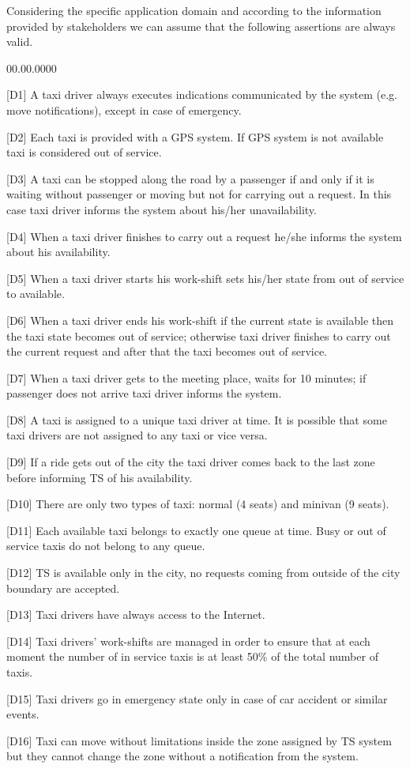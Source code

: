 Considering the specific application domain and according to the information
provided by stakeholders we can assume that the following assertions
are always valid.
\begin{lyxlist}{00.00.0000}
\item [{{[}D1{]}}] A taxi driver always executes indications communicated
by the system (e.g. move notifications), except in case of emergency.
\item [{{[}D2{]}}] Each taxi is provided with a GPS system. If GPS system
is not available taxi is considered out of service.
\item [{{[}D3{]}}] A taxi can be stopped along the road by a passenger
if and only if it is waiting without passenger or moving but not for
carrying out a request. In this case taxi driver informs the system
about his/her unavailability.
\item [{{[}D4{]}}] When a taxi driver finishes to carry out a request he/she
informs the system about his availability.
\item [{{[}D5{]}}] When a taxi driver starts his work-shift sets his/her
state from out of service to available.
\item [{{[}D6{]}}] When a taxi driver ends his work-shift if the current
state is available then the taxi state becomes out of service; otherwise
taxi driver finishes to carry out the current request and after that
the taxi becomes out of service.
\item [{{[}D7{]}}] When a taxi driver gets to the meeting place, waits
for 10 minutes; if passenger does not arrive taxi driver informs the
system.
\item [{{[}D8{]}}] A taxi is assigned to a unique taxi driver at time.
It is possible that some taxi drivers are not assigned to any taxi
or vice versa.
\item [{{[}D9{]}}] If a ride gets out of the city the taxi driver comes
back to the last zone before informing TS of his availability.
\item [{{[}D10{]}}] There are only two types of taxi: normal (4 seats)
and minivan (9 seats).
\item [{{[}D11{]}}] Each available taxi belongs to exactly one queue at
time. Busy or out of service taxis do not belong to any queue.
\item [{{[}D12{]}}] TS is available only in the city, no requests coming
from outside of the city boundary are accepted.
\item [{{[}D13{]}}] Taxi drivers have always access to the Internet.
\item [{{[}D14{]}}] Taxi drivers' work-shifts are managed in order to ensure
that at each moment the number of in service taxis is at least 50\%
of the total number of taxis.
\item [{{[}D15{]}}] Taxi drivers go in emergency state only in case of
car accident or similar events.
\item [{{[}D16{]}}] Taxi can move without limitations inside the zone assigned
by TS system but they cannot change the zone without a notification
from the system.
\end{lyxlist}
